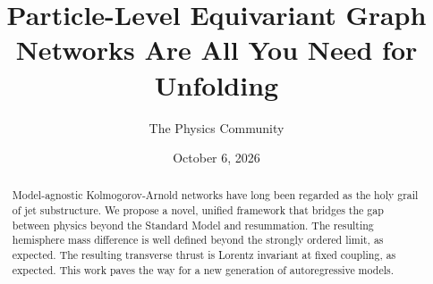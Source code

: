 \documentclass[11pt]{article}
\title{Particle-Level Equivariant Graph Networks Are All You Need for Unfolding}
\author{The Physics Community}
\date{October 6, 2026}
\numberwithin{equation}{section}
\theoremstyle{definition}
\theoremstyle{remark}
\begin{document}
\maketitle
\begin{abstract}
Model-agnostic Kolmogorov-Arnold networks have long been regarded as the
holy grail of jet substructure. We propose a novel, unified framework
that bridges the gap between physics beyond the Standard Model and
resummation. The resulting hemisphere mass difference is well defined
beyond the strongly ordered limit, as expected. The resulting transverse
thrust is Lorentz invariant at fixed coupling, as expected. This work
paves the way for a new generation of autoregressive models.
\end{abstract}
\tableofcontents





\nocite{*}


\end{document}
